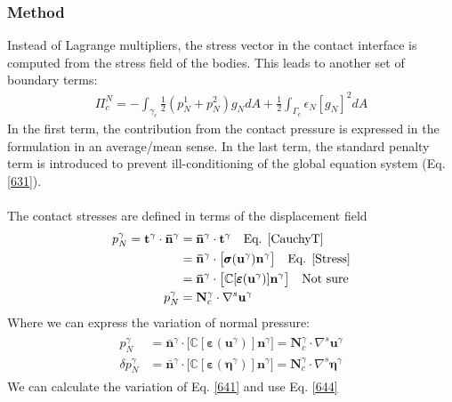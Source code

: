 \documentclass[12pt,3p]{article}
\numberwithin{equation}{section}
\begin{document}
\subsubsection{Method}
Instead of Lagrange multipliers, the stress vector in the contact interface is computed from the stress field of the bodies. This leads to another set of boundary terms: 
\begin{align}\label{641}
\Pi_c^N = - \int_{\gamma_c} \frac{1}{2} (p_N^1 + p_N^2) g_N dA + \frac{1}{2} \int_{\Gamma_c} \epsilon_N [g_N]^2 dA
\end{align}
In the first term, the contribution from the contact pressure is expressed in the formulation in an average/mean sense. In the last term, the standard penalty term is introduced to prevent ill-conditioning of the global equation system (Eq. \ref{631}). \\ \\
The contact stresses are defined in terms of the displacement field 
\begin{align}\label{642}
\begin{split}
p_N^\gamma = \mathbf{t}^\gamma \cdot \mathbf{\bar{n}}^\gamma &= \mathbf{\bar{n}}^\gamma \cdot \mathbf{t}^\gamma \quad \text{Eq. \ref{CauchyT}}\\
		     &= \mathbf{\bar{n}}^\gamma \cdot \big[ \pmb{\sigma} (\mathbf{u}^\gamma) \mathbf{n}^\gamma \big] \quad \text{Eq. \ref{Stress}} \\
		     &= \mathbf{\bar{n}}^\gamma \cdot \big[ \mathbb{C} [\pmb{\varepsilon} (\mathbf{u}^\gamma)] \mathbf{n}^\gamma \big] \quad \text{Not sure}\\
p_N^\gamma &= \mathbf{N}_c^\gamma \cdot \nabla^s \mathbf{u}^\gamma
\end{split}
\end{align}
Where we can express the variation of normal pressure: 
\begin{align}\label{644}
\begin{split}
p_N^\gamma &= \mathbf{\bar{n}}^\gamma \cdot \big[ \mathbb{C} [\pmb{\varepsilon} (\mathbf{u}^\gamma)] \mathbf{n}^\gamma \big] = \mathbf{N}_c^\gamma \cdot \nabla^s \mathbf{u}^\gamma \\
\delta p_N^\gamma &= \mathbf{\bar{n}}^\gamma \cdot \big[ \mathbb{C} [\pmb{\varepsilon} (\pmb{\eta}^\gamma)] \mathbf{n}^\gamma \big] = \mathbf{N}_c^\gamma \cdot \nabla^s \pmb{\eta}^\gamma
\end{split}
\end{align}
We can calculate the variation of Eq. \ref{641} and use Eq. \ref{644}
\end{document}
